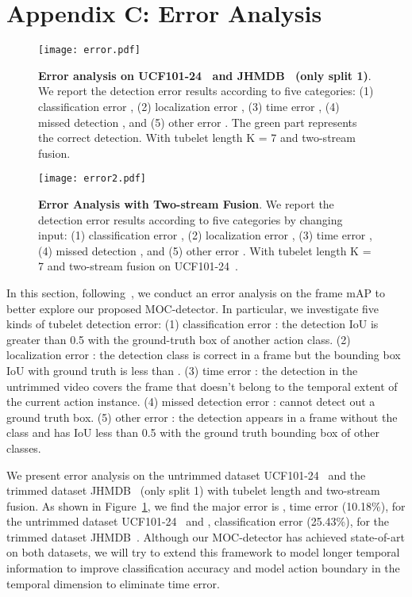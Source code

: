 \documentclass[runningheads]{llncs}
\begin{document}
\section*{Appendix C: Error Analysis}
\begin{figure}
    \centering
      \texttt{[image: error.pdf]}
      \caption{{\bf Error analysis on UCF101-24~\cite{UCF101} and JHMDB~\cite{JHMDB} (only split 1)}. We report the detection error results according to
      five categories: (1) classification error , (2) localization error , (3) time error , (4) missed detection , and (5) other error . The green part represents the correct detection. With tubelet length K = 7 and two-stream fusion.
       }
    \label{fig:error}
\end{figure}
\begin{figure}
\centering
    \texttt{[image: error2.pdf]}
    \caption{{\bf Error Analysis with Two-stream Fusion}. We report the detection error results according to five categories by changing input: (1) classification error , (2) localization error , (3) time error , (4) missed detection , and (5) other error . With tubelet length K = 7 and two-stream fusion on UCF101-24~\cite{UCF101}.}
    \label{fig:error-fusion}
\end{figure}
In this section, following~\cite{kalogeiton2017action}, we conduct an error analysis on the frame mAP to better explore our proposed MOC-detector. In particular, we investigate five kinds of tubelet detection error: (1) classification error : the detection IoU is greater than 0.5 with the ground-truth box of another action class. (2) localization error : the detection class is correct in a frame but the bounding box IoU with ground truth is less than . (3) time error : the detection in the untrimmed video covers the frame that doesn't belong to the temporal extent of the current action instance. (4) missed detection error : cannot detect out a ground truth box. (5) other error : the detection appears in a frame without the class and has IoU less than 0.5 with the ground truth bounding box of other classes.

We present error analysis on the untrimmed dataset UCF101-24~\cite{UCF101} and the trimmed dataset JHMDB~\cite{JHMDB} (only split 1) with tubelet length  and two-stream fusion. As shown in Figure~\ref{fig:error}, we find the major error is , time error (10.18\%), for the untrimmed dataset UCF101-24~\cite{UCF101} and , classification error (25.43\%), for the trimmed dataset JHMDB~\cite{JHMDB}. Although our MOC-detector has achieved state-of-art on both datasets, we will try to extend this framework to model longer temporal information to improve classification accuracy and model action boundary in the temporal dimension to eliminate time error.
\end{document}
